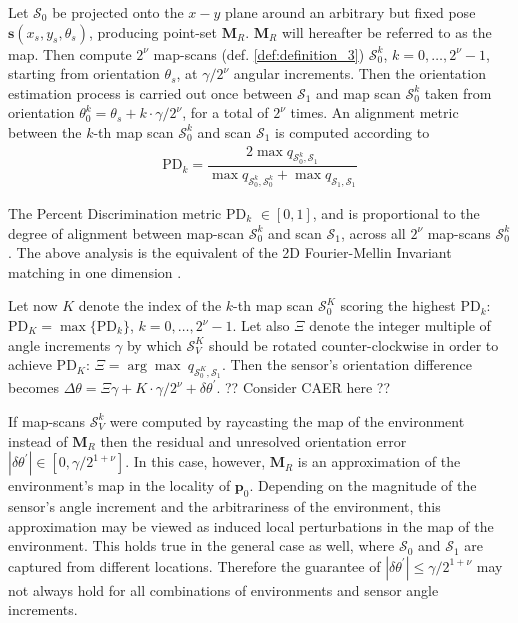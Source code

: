 Let $\mathcal{S}_0$ be projected onto the $x-y$ plane around an arbitrary but
fixed pose $\bm{s}(x_s, y_s, \theta_s)$, producing point-set $\bm{M}_R$.
$\bm{M}_R$ will hereafter be referred to as the map. Then compute $2^\nu$
map-scans (def. \ref{def:definition_3}) $\mathcal{S}_0^k$,
$k = 0,\dots,2^\nu-1$, starting from orientation $\theta_s$, at $\gamma / 2^\nu$
angular increments. Then the orientation estimation process is carried out once
between $\mathcal{S}_1$ and map scan $\mathcal{S}_0^k$ taken from orientation
$\theta_0^k = \theta_s + k \cdot \gamma / 2^\nu$, for a total of $2^\nu$ times.
An alignment metric between the $k$-th map scan $\mathcal{S}_0^k$ and scan
$\mathcal{S}_1$ is computed according to
\begin{align}
  \text{PD}_k = \dfrac{2 \max q_{\mathcal{S}_0^k,\mathcal{S}_1}}{\max q_{\mathcal{S}_0^k,\mathcal{S}_0^k} + \max q_{\mathcal{S}_1,\mathcal{S}_1}}
  \label{eq:pd}
\end{align}

The Percent Discrimination metric PD$_k$ $\in [0,1]$, and is proportional to
the degree of alignment between map-scan $\mathcal{S}_0^k$ and
scan $\mathcal{S}_1$, across all $2^\nu$ map-scans $\mathcal{S}_0^k$.
The above analysis is the equivalent of the 2D Fourier-Mellin Invariant
matching in one dimension \cite{fmt2d}.

Let now $K$ denote the index of the $k$-th map scan
$\mathcal{S}_0^K$ scoring the highest PD$_k$: $\text{PD}_K =
\max \{\text{PD}_k\}$, $k = 0,\dots,2^\nu-1$. Let also $\Xi$ denote the integer
multiple of angle increments $\gamma$ by which $\mathcal{S}_V^K$
should be rotated counter-clockwise in order to achieve PD$_K$:
$\Xi = \arg\max\ q_{\mathcal{S}_0^K, \mathcal{S}_1}$.  Then the sensor's
orientation difference becomes
$\Delta\theta = \Xi\gamma + K \cdot \gamma/2^\nu + \delta\theta^\prime$.
?? Consider CAER here ??

If map-scans $\mathcal{S}_V^k$ were computed by raycasting the map of the
environment instead of $\bm{M}_R$ then the residual and unresolved orientation
error $|\delta\theta^\prime| \in [0,\gamma / 2^{1+\nu}]$. In this case, however,
$\bm{M}_R$ is an approximation of the environment's map in the locality of
$\bm{p}_0$. Depending on the magnitude of the sensor's angle increment and
the arbitrariness of the environment, this approximation may be viewed as
induced local perturbations in the map of the environment. This holds true
in the general case as well, where $\mathcal{S}_0$ and $\mathcal{S}_1$ are
captured from different locations. Therefore the guarantee of
$|\delta\theta^\prime| \leq \gamma / 2^{1+\nu}$ may not always hold for all
combinations of environments and sensor angle increments.
